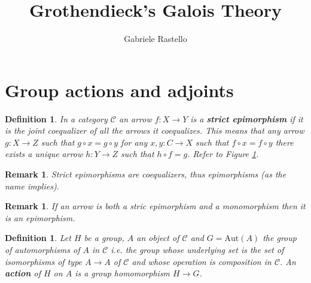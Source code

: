 \documentclass[italian, 12pt, reqno]{article}
\theoremstyle{myteo}
\newtheorem{definition}[theorem]{Definition}
\newtheorem{remark}[theorem]{Remark}
\numberwithin{equation}{section}
\newcommand{\cat}[1]{\mathscr{#1}}
\newcommand{\aut}{\text{Aut}}
\newcommand{\fun}[3]{#1\colon#2\to #3}
\begin{document}
\title{Grothendieck's Galois Theory}
\author{Gabriele Rastello}
\maketitle

\section{Group actions and adjoints}
\label{sec:1}

\begin{definition}
  \label{def:strit_epi}
  In a category \(\cat{C}\) an arrow \(\fun{f}{X}{Y}\) is a \textbf{strict epimorphism} if it is the joint coequalizer of all the arrows it coequalizes.
  This means that any arrow \(\fun{g}{X}{Z}\) such that \(g\circ x = g\circ y\) for any \(\fun{x,y}{C}{X}\) such that \(f\circ x = f\circ y\) there exists a unique arrow \(\fun{h}{Y}{Z}\) such that \(h\circ f = g\).
  Refer to Figure \ref{diagram:strict_epi}.
\end{definition}

\begin{figure}[h]
  \begin{center}
  \end{center}
  \caption{}
  \label{diagram:strict_epi}
\end{figure}

\begin{remark}
  \label{rem:strict_epi}
  Strict epimorphisms are coequalizers, thus epimorphisms (as the name implies).
\end{remark}

\begin{remark}
  \label{rem:strict_epi_plus_mono}
  If an arrow is both a stric epimorphism and a monomorphism then it is an epimorphism.
\end{remark}

\begin{definition}
  \label{def:action}
  Let \(H\) be a group, \(A\) an object of \(\cat{C}\) and \(G = \aut(A)\) the group of automorphisms of \(A\) in \(\cat{C}\) i.e. the group whose underlying set is the set of isomorphisms of type \(A\to A\) of \(\cat{C}\) and whose operation is composition in \(\cat{C}\).
  An \textbf{action} of \(H\) on \(A\) is a group homomorphism \(H \to G\).
\end{definition}
\end{document}
